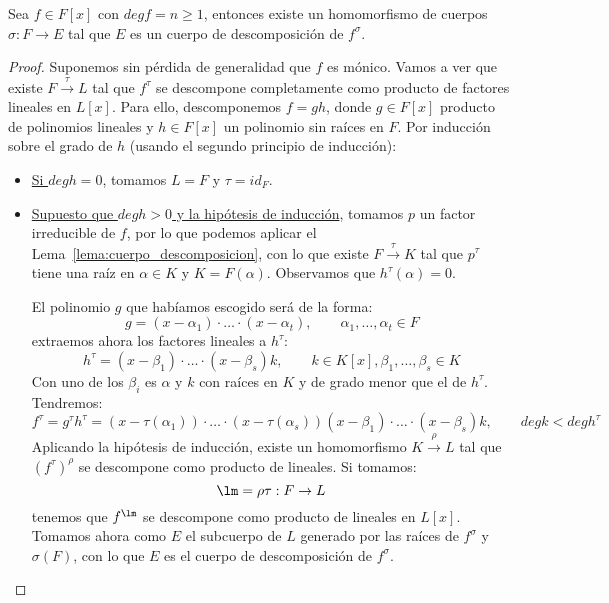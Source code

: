 \begin{prop}
    Sea $f\in F[x]$ con $degf = n \geq 1$, entonces existe un homomorfismo de cuerpos $\sigma:F\to E$ tal que $E$ es un cuerpo de descomposición de $f^{\sigma}$.
    \begin{proof}
        Suponemos sin pérdida de generalidad que $f$ es mónico. Vamos a ver que existe $F\stackrel{\tau}{\to}L$ tal que $f^\tau$ se descompone completamente como producto de factores lineales en $L[x]$. Para ello, descomponemos $f=gh$, donde $g\in F[x]$ producto de polinomios lineales y $h\in F[x]$ un polinomio sin raíces en $F$. Por inducción sobre el grado de $h$ (usando el segundo principio de inducción):
        \begin{itemize}
            \item \underline{Si $deg h = 0$}, tomamos $L = F$ y $\tau = id_F$.
            \item \underline{Supuesto que $degh>0$ y la hipótesis de inducción}, tomamos $p$ un factor irreducible de $f$, por lo que podemos aplicar el Lema~\ref{lema:cuerpo_descomposicion}, con lo que existe $F\stackrel{\tau}{\to}K$ tal que $p^\tau$ tiene una raíz en $\alpha\in K$ y $K = F(\alpha)$. Observamos que $h^\tau(\alpha)=0$.

                El polinomio $g$ que habíamos escogido será de la forma:
                \begin{equation*}
                    g = (x-\alpha_1)\cdot  \ldots \cdot (x-\alpha_t), \qquad \alpha_1,\ldots,\alpha_t \in F
                \end{equation*}
                extraemos ahora los factores lineales a $h^\tau$:
                \begin{equation*}
                    h^\tau = (x-\beta_1)\cdot \ldots\cdot (x-\beta_s)k, \qquad k\in K[x], \beta_1,\ldots,\beta_s\in K
                \end{equation*}
                Con uno de los $\beta_i$ es $\alpha$ y $k$ con raíces en $K$ y de grado menor que el de $h^\tau$.  Tendremos:
                \begin{equation*}
                    f^\tau = g^\tau h^\tau = (x-\tau(\alpha_1))\cdot  \ldots \cdot (x-\tau(\alpha_s))(x-\beta_1) \cdot \ldots \cdot (x-\beta_s)k, \qquad deg k < deg h^\tau
                \end{equation*}
                Aplicando la hipótesis de inducción, existe un homomorfismo $K\stackrel{\rho}{\to}L$ tal que ${(f^\tau)}^{\rho}$ se descompone como producto de lineales. Si tomamos:
                \begin{equation*}
                    \lm = \rho\tau : F\to L
                \end{equation*}
                tenemos que $f^\lm$ se descompone como producto de lineales en $L[x]$. Tomamos ahora como $E$ el subcuerpo de $L$ generado por las raíces de $f^\sigma$ y $\sigma(F)$, con lo que $E$ es el cuerpo de descomposición de $f^\sigma$.
        \end{itemize}
    \end{proof}
\end{prop}

